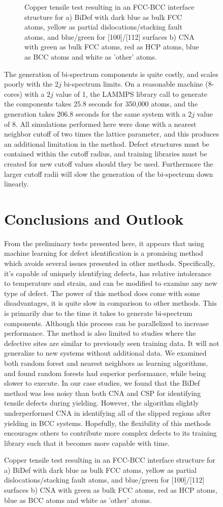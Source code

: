 \documentclass[12pt]{iopart}
\begin{document}
\begin{figure}[htbp]
\begin{figure}
\begin{center}
\caption{Copper tensile test resulting in an FCC-BCC interface structure for a) BiDef with dark blue as bulk FCC atoms, yellow as partial dislocations/stacking fault atoms, and blue/green for [100]/[112] surfaces b) CNA with green as bulk FCC atoms, red as HCP atoms, blue as BCC atoms and white as 'other' atoms.}
\label{fig:fccbcc_interface}
\end{center}
\end{figure}

The generation of bi-spectrum components is quite costly, and scales poorly with the $2j$ bi-spectrum limits. On a reasonable machine (8-cores) with a $2j$ value of 1, the LAMMPS library call to generate the components takes 25.8 seconds for 350,000 atoms, and the generation takes 206.8 seconds for the same system with a $2j$ value of 8. All simulations performed here were done with a nearest neighbor cutoff of two times the lattice parameter, and this produces an additional limitation in the method. Defect structures must be contained within the cutoff radius, and training libraries must be created for new cutoff values should they be used. Furthermore the larger cutoff radii will slow the generation of the bi-spectrum down linearly. 

\section{Conclusions and Outlook}

From the preliminary tests presented here, it appears that using machine learning for defect identification is a promising method which avoids several issues presented in other methods. Specifically, it's capable of uniquely identifying defects, has relative intolerance to temperature and strain, and can be modified to examine any new type of defect. The power of this method does come with some disadvantages, it is quite slow in comparison to other methods. This is primarily due to the time it takes to generate bi-spectrum components. Although this process can be parallelized to increase performance. The method is also limited to studies where the defective sites are similar to previously seen training data. It will not generalize to new systems without additional data. We examined both random forest and nearest neighbors as learning algorithms, and found random forests had superior performance, while being slower to execute. In our case studies, we found that the BiDef method was less noisy than both CNA and CSP for identifying tensile defects during yielding. However, the algorithm slightly underperformed CNA in identifying all of the slipped regions after yielding in BCC systems. Hopefully, the flexibility of this methods encourages others to contribute more complex defects to its training library such that it becomes more capable with time.


\end{figure}
\end{document}
